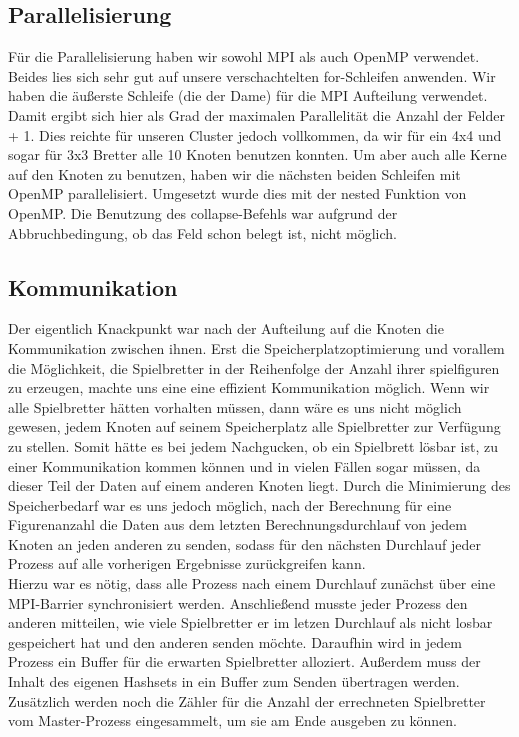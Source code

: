 \documentclass[
	12pt,
	a4paper,
	BCOR10mm,
	DIV14,
	listof=totoc,
	bibliography=totoc,
	headsepline
]{scrreprt}
\begin{document}
\subsection{Parallelisierung}
Für die Parallelisierung haben wir sowohl MPI als auch OpenMP verwendet. Beides lies sich sehr gut auf unsere verschachtelten for-Schleifen anwenden. Wir haben die äußerste Schleife (die der Dame) für die MPI Aufteilung verwendet. Damit ergibt sich hier als Grad der maximalen Parallelität die Anzahl der Felder + 1. Dies reichte für unseren Cluster jedoch vollkommen, da wir für ein 4x4 und sogar für 3x3 Bretter alle 10 Knoten benutzen konnten. 
Um aber auch alle Kerne auf den Knoten zu benutzen, haben wir die nächsten beiden Schleifen mit OpenMP parallelisiert. Umgesetzt wurde dies mit der nested Funktion von OpenMP. Die Benutzung des collapse-Befehls war aufgrund der Abbruchbedingung, ob das Feld schon belegt ist, nicht möglich.


\subsection{Kommunikation}
Der eigentlich Knackpunkt war nach der Aufteilung auf die Knoten die Kommunikation zwischen ihnen. Erst die Speicherplatzoptimierung und vorallem die Möglichkeit, die Spielbretter in der Reihenfolge der Anzahl ihrer spielfiguren zu erzeugen, machte uns eine eine effizient Kommunikation möglich.
Wenn wir alle Spielbretter hätten vorhalten müssen, dann wäre es uns nicht möglich gewesen, jedem Knoten auf seinem Speicherplatz alle Spielbretter zur Verfügung zu stellen. Somit hätte es bei jedem Nachgucken, ob ein Spielbrett lösbar ist, zu einer Kommunikation kommen können und in vielen Fällen sogar müssen, da dieser Teil der Daten auf einem anderen Knoten liegt. Durch die Minimierung des Speicherbedarf war es uns jedoch möglich, nach der Berechnung für eine Figurenanzahl die Daten aus dem letzten Berechnungsdurchlauf von jedem Knoten an jeden anderen zu senden, sodass für den nächsten Durchlauf jeder Prozess auf alle vorherigen Ergebnisse zurückgreifen kann.  \\
Hierzu war es nötig, dass alle Prozess nach einem Durchlauf zunächst über eine MPI-Barrier synchronisiert werden. Anschließend musste jeder Prozess den anderen mitteilen, wie viele Spielbretter er im letzen Durchlauf als nicht losbar gespeichert hat und den anderen senden möchte. Daraufhin wird in jedem Prozess ein Buffer für die erwarten Spielbretter alloziert. Außerdem muss der Inhalt des eigenen Hashsets in ein Buffer zum Senden übertragen werden.
Zusätzlich werden noch die Zähler für die Anzahl der errechneten Spielbretter vom Master-Prozess eingesammelt, um sie am Ende ausgeben zu können.
 
\end{document}
